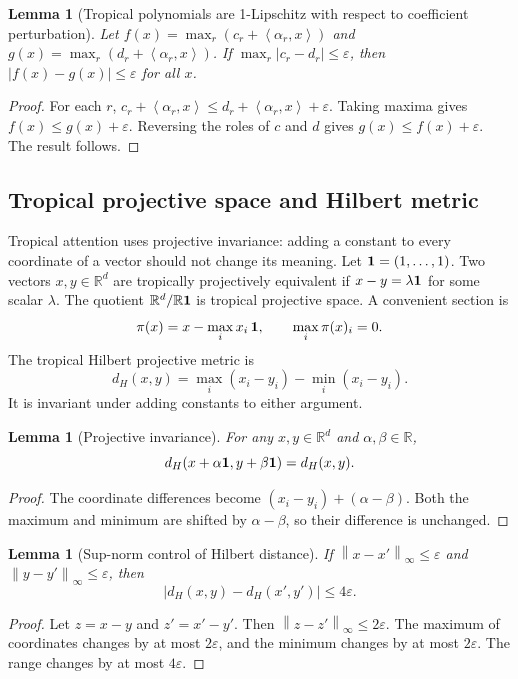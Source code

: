 \documentclass[11pt]{article}
\newtheorem{lemma}[definition]{Lemma}
\newcommand{\R}{\mathbb{R}}
\newcommand{\norm}[1]{\left\lVert #1\right\rVert}
\newcommand{\ip}[2]{\left\langle #1,#2\right\rangle}
\newcommand{\eps}{\varepsilon}
\begin{document}
\begin{lemma}[Tropical polynomials are 1-Lipschitz with respect to coefficient perturbation]
Let
\(f(x)=\max_r(c_r+\ip{\alpha_r}{x})\) and \(g(x)=\max_r(d_r+\ip{\alpha_r}{x})\).  If \(\max_r|c_r-d_r|\le \eps\), then \(|f(x)-g(x)|\le \eps\) for all \(x\).
\end{lemma}
\begin{proof}
For each \(r\), \(c_r+\ip{\alpha_r}{x}\le d_r+\ip{\alpha_r}{x}+\eps\).  Taking maxima gives \(f(x)\le g(x)+\eps\).  Reversing the roles of \(c\) and \(d\) gives \(g(x)\le f(x)+\eps\).  The result follows.
\end{proof}

\subsection{Tropical projective space and Hilbert metric}

Tropical attention uses projective invariance: adding a constant to every coordinate of a vector should not change its meaning.  Let \({\bf 1}=(1,\ldots,1)\).  Two vectors \(x,y\in\R^d\) are tropically projectively equivalent if \(x-y=\lambda {\bf 1}\) for some scalar \(\lambda\).  The quotient \(\R^d/\R{\bf 1}\) is tropical projective space.  A convenient section is
\begin{equation}
\pi(x)=x-\max_i x_i\, {\bf 1},\qquad \max_i \pi(x)_i=0.
\end{equation}
The tropical Hilbert projective metric is
\begin{equation}
d_H(x,y)=\max_i(x_i-y_i)-\min_i(x_i-y_i).
\end{equation}
It is invariant under adding constants to either argument.

\begin{lemma}[Projective invariance]
For any \(x,y\in\R^d\) and \(\alpha,\beta\in\R\),
\begin{equation}
d_H(x+\alpha{\bf 1},y+\beta{\bf 1})=d_H(x,y).
\end{equation}
\end{lemma}
\begin{proof}
The coordinate differences become \((x_i-y_i)+(\alpha-\beta)\).  Both the maximum and minimum are shifted by \(\alpha-\beta\), so their difference is unchanged.
\end{proof}

\begin{lemma}[Sup-norm control of Hilbert distance]
If \(\norm{x-x'}_\infty\le \eps\) and \(\norm{y-y'}_\infty\le \eps\), then
\begin{equation}
|d_H(x,y)-d_H(x',y')|\le 4\eps.
\end{equation}
\end{lemma}
\begin{proof}
Let \(z=x-y\) and \(z'=x'-y'\).  Then \(\norm{z-z'}_\infty\le 2\eps\).  The maximum of coordinates changes by at most \(2\eps\), and the minimum changes by at most \(2\eps\).  The range changes by at most \(4\eps\).
\end{proof}
\end{document}
